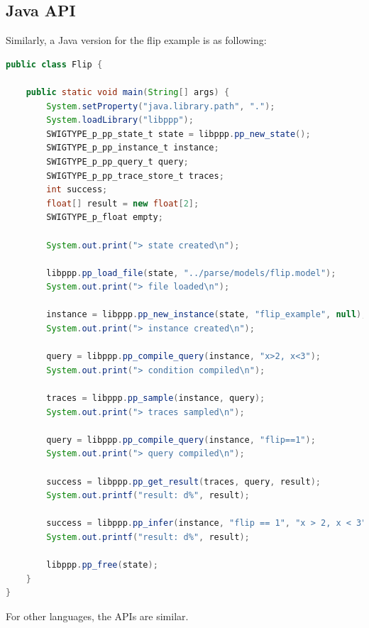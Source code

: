 \subsection{Java API}
Similarly, a Java version for the flip example is as following:
\begin{lstlisting}[language=Java]
public class Flip {

    public static void main(String[] args) {
        System.setProperty("java.library.path", ".");
        System.loadLibrary("libppp");
        SWIGTYPE_p_pp_state_t state = libppp.pp_new_state();
        SWIGTYPE_p_pp_instance_t instance;
        SWIGTYPE_p_pp_query_t query;
        SWIGTYPE_p_pp_trace_store_t traces;
        int success;
        float[] result = new float[2];
        SWIGTYPE_p_float empty;

        System.out.print("> state created\n");

        libppp.pp_load_file(state, "../parse/models/flip.model");
        System.out.print("> file loaded\n");

        instance = libppp.pp_new_instance(state, "flip_example", null);
        System.out.print("> instance created\n");

        query = libppp.pp_compile_query(instance, "x>2, x<3");
        System.out.print("> condition compiled\n");

        traces = libppp.pp_sample(instance, query);
        System.out.print("> traces sampled\n");

        query = libppp.pp_compile_query(instance, "flip==1");
        System.out.print("> query compiled\n");

        success = libppp.pp_get_result(traces, query, result);
        System.out.printf("result: d%", result);

        success = libppp.pp_infer(instance, "flip == 1", "x > 2, x < 3", result);
        System.out.printf("result: d%", result);

        libppp.pp_free(state);
    }
}
\end{lstlisting}

For other languages, the APIs are similar.
